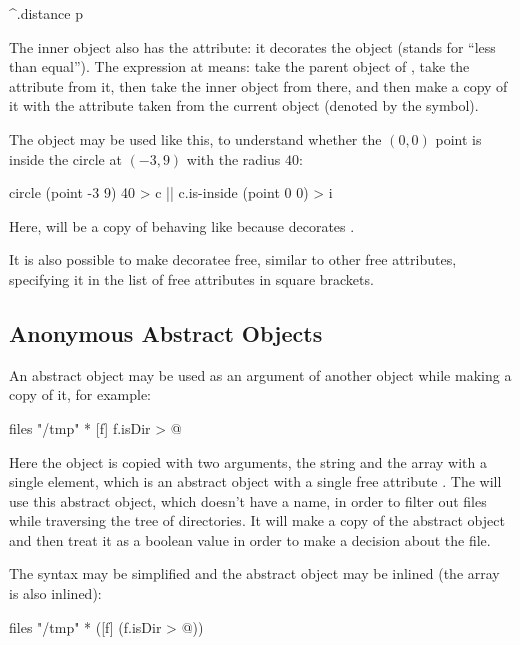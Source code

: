 \begin{ffcode}
^.distance p
\end{ffcode}

The inner object  also has the  attribute: it
decorates the object  (stands for ``less than equal'').
The expression at  means:
take the parent object of ,
take the attribute  from it, then take the inner object 
from there, and then make a copy of it with the attribute 
taken from the current object (denoted by the \ff{\$} symbol).

The object  may be used like this, to understand whether
the $(0,0)$ point is inside the circle at $(-3,9)$ with the radius $40$:

\begin{ffcode}
circle (point -3 9) 40 > c  |$\label{ln:circle-c}$|
c.is-inside (point 0 0) > i
\end{ffcode}

Here,  will be a copy of  behaving like 
because  decorates .

It is also possible to make decoratee free, similar to other free
attributes, specifying it in the list of free attributes in
square brackets.

\subsection{Anonymous Abstract Objects}

An abstract object may be used as an argument of another object while
making a copy of it, for example:

\begin{ffcode}
files
  "/tmp"
  *
    [f]
      f.isDir > @
\end{ffcode}

Here the object  is copied with two arguments, the string
 and the array with a single element, which is an
abstract object with a single free attribute . The 
will use this abstract object, which doesn't have a name, in order
to filter out files while traversing the tree of directories. It will
make a copy of the abstract object and then treat it as a boolean
value in order to make a decision about the file.

The syntax may be simplified and the abstract object may be inlined
(the array is also inlined):

\begin{ffcode}
files
  "/tmp"
  * ([f] (f.isDir > @))
\end{ffcode}

